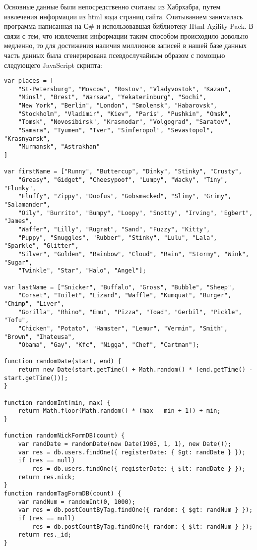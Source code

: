 \documentclass[a4paper]{article}
\begin{document}
Основные данные были непосредственно считаны из Хабрхабра, путем извлечения информации из html кода страниц сайта. Считыванием занималась программа написанная на С# и использовавшая библиотеку Html Agility Pack. В связи с тем, что извлечения информации таким способом происходило довольно медленно, то для достижения наличия миллионов записей в нашей базе данных часть данных была сгенерирована псевдослучайным образом с помощью следующего JavaScript скрипта:
\begin{verbatim}
var places = [
    "St-Petersburg", "Moscow", "Rostov", "Vladyvostok", "Kazan",
    "Minsl", "Brest", "Warsaw", "Yekaterinburg", "Sochi",
    "New York", "Berlin", "London", "Smolensk", "Habarovsk",
    "Stockholm", "Vladimir", "Kiev", "Paris", "Pushkin", "Omsk",
    "Tomsk", "Novosibirsk", "Krasnodar", "Volgograd", "Saratov",
    "Samara", "Tyumen", "Tver", "Simferopol", "Sevastopol", "Krasnyarsk",
    "Murmansk", "Astrakhan"
]

var firstName = ["Runny", "Buttercup", "Dinky", "Stinky", "Crusty",
    "Greasy", "Gidget", "Cheesypoof", "Lumpy", "Wacky", "Tiny", "Flunky",
    "Fluffy", "Zippy", "Doofus", "Gobsmacked", "Slimy", "Grimy", "Salamander",
    "Oily", "Burrito", "Bumpy", "Loopy", "Snotty", "Irving", "Egbert", "James",
    "Waffer", "Lilly", "Rugrat", "Sand", "Fuzzy", "Kitty",
    "Puppy", "Snuggles", "Rubber", "Stinky", "Lulu", "Lala", "Sparkle", "Glitter",
    "Silver", "Golden", "Rainbow", "Cloud", "Rain", "Stormy", "Wink", "Sugar",
    "Twinkle", "Star", "Halo", "Angel"];

var lastName = ["Snicker", "Buffalo", "Gross", "Bubble", "Sheep",
    "Corset", "Toilet", "Lizard", "Waffle", "Kumquat", "Burger", "Chimp", "Liver",
    "Gorilla", "Rhino", "Emu", "Pizza", "Toad", "Gerbil", "Pickle", "Tofu",
    "Chicken", "Potato", "Hamster", "Lemur", "Vermin", "Smith", "Brown", "Ihateusa",
    "Obama", "Gay", "Kfc", "Nigga", "Chef", "Cartman"];

function randomDate(start, end) {
    return new Date(start.getTime() + Math.random() * (end.getTime() - start.getTime()));
}

function randomInt(min, max) {
    return Math.floor(Math.random() * (max - min + 1)) + min;
}

function randomNickFormDB(count) {
    var randDate = randomDate(new Date(1905, 1, 1), new Date());
    var res = db.users.findOne({ registerDate: { $gt: randDate } });
    if (res == null)
        res = db.users.findOne({ registerDate: { $lt: randDate } });
    return res.nick;
}
function randomTagFormDB(count) {
    var randNum = randomInt(0, 1000);
    var res = db.postCountByTag.findOne({ random: { $gt: randNum } });
    if (res == null)
        res = db.postCountByTag.findOne({ random: { $lt: randNum } });
    return res._id;
}


\end{verbatim}
\end{document}
